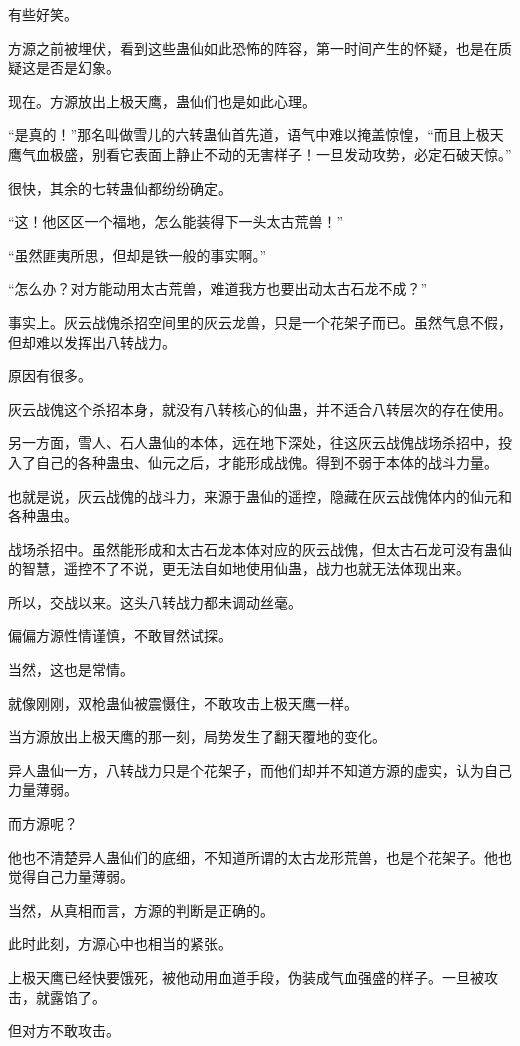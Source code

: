 \begin{this_body}
有些好笑。

方源之前被埋伏，看到这些蛊仙如此恐怖的阵容，第一时间产生的怀疑，也是在质疑这是否是幻象。

现在。方源放出上极天鹰，蛊仙们也是如此心理。

“是真的！”那名叫做雪儿的六转蛊仙首先道，语气中难以掩盖惊惶，“而且上极天鹰气血极盛，别看它表面上静止不动的无害样子！一旦发动攻势，必定石破天惊。”

很快，其余的七转蛊仙都纷纷确定。

“这！他区区一个福地，怎么能装得下一头太古荒兽！”

“虽然匪夷所思，但却是铁一般的事实啊。”

“怎么办？对方能动用太古荒兽，难道我方也要出动太古石龙不成？”

事实上。灰云战傀杀招空间里的灰云龙兽，只是一个花架子而已。虽然气息不假，但却难以发挥出八转战力。

原因有很多。

灰云战傀这个杀招本身，就没有八转核心的仙蛊，并不适合八转层次的存在使用。

另一方面，雪人、石人蛊仙的本体，远在地下深处，往这灰云战傀战场杀招中，投入了自己的各种蛊虫、仙元之后，才能形成战傀。得到不弱于本体的战斗力量。

也就是说，灰云战傀的战斗力，来源于蛊仙的遥控，隐藏在灰云战傀体内的仙元和各种蛊虫。

战场杀招中。虽然能形成和太古石龙本体对应的灰云战傀，但太古石龙可没有蛊仙的智慧，遥控不了不说，更无法自如地使用仙蛊，战力也就无法体现出来。

所以，交战以来。这头八转战力都未调动丝毫。

偏偏方源性情谨慎，不敢冒然试探。

当然，这也是常情。

就像刚刚，双枪蛊仙被震慑住，不敢攻击上极天鹰一样。

当方源放出上极天鹰的那一刻，局势发生了翻天覆地的变化。

异人蛊仙一方，八转战力只是个花架子，而他们却并不知道方源的虚实，认为自己力量薄弱。

而方源呢？

他也不清楚异人蛊仙们的底细，不知道所谓的太古龙形荒兽，也是个花架子。他也觉得自己力量薄弱。

当然，从真相而言，方源的判断是正确的。

此时此刻，方源心中也相当的紧张。

上极天鹰已经快要饿死，被他动用血道手段，伪装成气血强盛的样子。一旦被攻击，就露馅了。

但对方不敢攻击。


\end{this_body}
